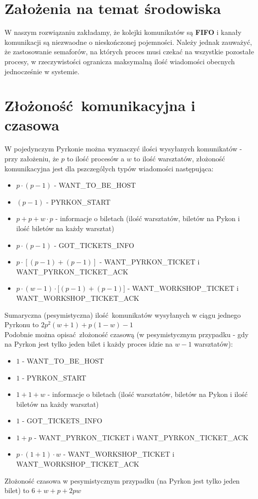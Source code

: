 \documentclass[10pt,a4paper]{article}
\begin{document}
\section{Założenia na temat środowiska}
W naszym rozwiązaniu zakładamy, że kolejki komunikatów są \textbf{FIFO} i kanały komunikacji są niezwaodne o nieskończonej pojemności.
Należy jednak zauważyć, że zastosowanie semaforów, na których proces musi czekać na wszystkie pozostałe procesy, w rzeczywistości ogranicza
maksymalną ilość wiadomości obecnych jednocześnie w systemie.

\section{Złożoność komunikacyjna i czasowa}
W pojedynczym Pyrkonie można wyznaczyć ilości wysyłanych komunikatów - przy założeniu, że $p$ to ilość procesów a $w$ to ilość warsztatów,
złożoność komunikacyjna jest dla pszczególych typów wiadomości następująca:\\
\begin{itemize}
    \item $p \cdot (p-1)$ - WANT\_TO\_BE\_HOST
    \item $(p-1)$ - PYRKON\_START
    \item $p + p + w\cdot p$ - informacje o biletach (ilość warsztatów, biletów na Pykon i ilość biletów na każdy warsztat)
    \item $p \cdot (p-1)$ - GOT\_TICKETS\_INFO
    \item $p \cdot [(p-1) + (p-1)]$ - WANT\_PYRKON\_TICKET i WANT\_PYRKON\_TICKET\_ACK
    \item $p \cdot (w-1) \cdot [(p-1) + (p-1)$] - WANT\_WORKSHOP\_TICKET i WANT\_WORKSHOP\_TICKET\_ACK
\end{itemize}
Sumaryczna (pesymistyczna) ilość komunikatów wysyłanych w ciągu jednego Pyrkonu to
$2p^2 (w+1) + p(1-w) - 1$\\

Podobnie można opisać złożoność czasową (w pesymistycznym przypadku - gdy na Pyrkon jest tylko jeden bilet i każdy proces idzie na $w-1$ warsztatów):\\
\begin{itemize}
    \item $1$ - WANT\_TO\_BE\_HOST
    \item $1$ - PYRKON\_START
    \item $1 + 1 + w$ - informacje o biletach (ilość warsztatów, biletów na Pykon i ilość biletów na każdy warsztat)
    \item $1$ - GOT\_TICKETS\_INFO
    \item $1 + p$ - WANT\_PYRKON\_TICKET i WANT\_PYRKON\_TICKET\_ACK
    \item $p\cdot (1+1) \cdot w$ - WANT\_WORKSHOP\_TICKET i WANT\_WORKSHOP\_TICKET\_ACK
\end{itemize}

Złożoność czasowa w pesymistycznym przypadku (na Pyrkon jest tylko jeden bilet) to $6 + w + p + 2 p w$
\end{document}
